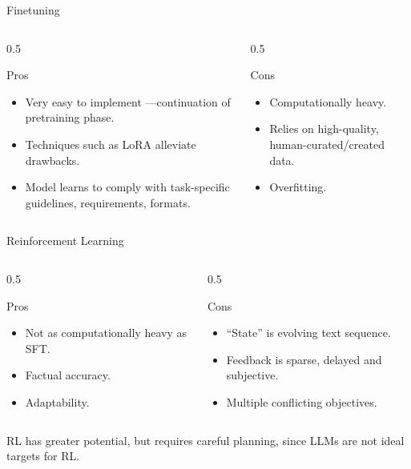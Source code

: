 \documentclass[24pt]{beamer}
\begin{document}
\begin{frame}{Finetuning}
	\begin{columns}
		\begin{column}{0.5\textwidth}
			\begin{exampleblock}{Pros}
				\begin{itemize}
					\item Very easy to implement ---continuation of pretraining phase.
					\item Techniques such as LoRA alleviate drawbacks.
					\item Model learns to comply with task-specific guidelines, requirements, formats.
				\end{itemize}
			\end{exampleblock}
		\end{column}
		\begin{column}{0.5\textwidth}
			\begin{alertblock}{Cons}
				\begin{itemize}
					\item Computationally heavy.
					\item Relies on high-quality, human-curated/created data.
					\item Overfitting.
				\end{itemize}
			\end{alertblock}
		\end{column}
	\end{columns}
\end{frame}

\begin{frame}{Reinforcement Learning}
	\begin{columns}
		\begin{column}{0.5\textwidth}
			\begin{exampleblock}{Pros}
				\begin{itemize}
					\item Not as computationally heavy as SFT.
					\item Factual accuracy.
					\item Adaptability.
				\end{itemize}
			\end{exampleblock}
		\end{column}
		\begin{column}{0.5\textwidth}
			\begin{alertblock}{Cons}
				\begin{itemize}
					\item ``State'' is evolving text sequence.
					\item Feedback is sparse, delayed and subjective.
					\item Multiple conflicting objectives.
				\end{itemize}
			\end{alertblock}
		\end{column}
	\end{columns}
	
	\begin{block}{}
		RL has greater potential, but requires careful planning, since LLMs are \alert{not ideal targets} for RL.
	\end{block}
\end{frame}
\end{document}
